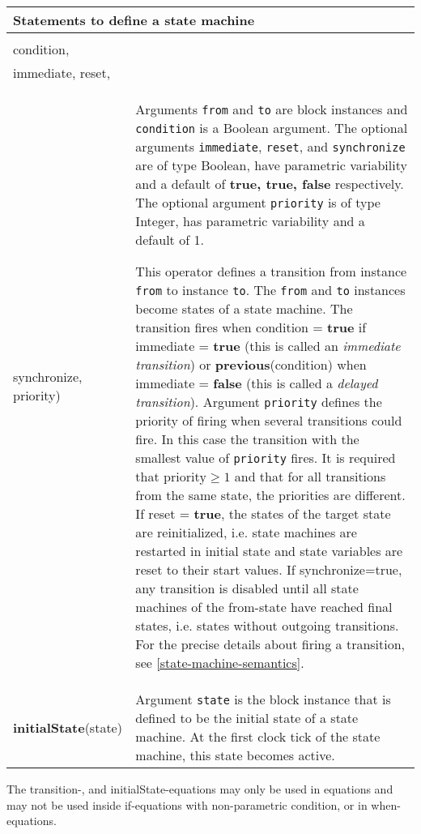 \begin{longtable}[]{|p{4cm}|p{10cm}|}
\hline \endhead
\multicolumn{2}{|p{12cm}|}{\textbf{Statements to define a state machine}}\\ \hline
\begin{tabular}{@{}p{4cm}@{}}
\textbf{transition}(from, to, \\ condition,\\
immediate, reset,\\
synchronize, priority)
\end{tabular}
&
Arguments \lstinline!from! and \lstinline!to! are block instances and \lstinline!condition! is a
Boolean argument. The optional arguments \lstinline!immediate!, \lstinline!reset!, and
\lstinline!synchronize! are of type Boolean, have parametric variability and a
default of \textbf{true, true, false} respectively. The optional
argument \lstinline!priority! is of type Integer, has parametric variability and
a default of 1.

This operator defines a transition from instance \lstinline!from! to instance
\lstinline!to!. The \lstinline!from! and \lstinline!to! instances become states of a state
machine. The transition fires when condition = \textbf{true} if
immediate = \textbf{true} (this is called an \emph{immediate transition})
or \textbf{previous}(condition) when immediate = \textbf{false} (this is
called a \emph{delayed transition}). Argument \lstinline!priority! defines the
priority of firing when several transitions could fire. In this case the
transition with the smallest value of \lstinline!priority! fires. It is required
that $\textrm{priority}\ge 1$ and that for all transitions from the same state, the
priorities are different. If reset = \textbf{true}, the states of the
target state are reinitialized, i.e. state machines are restarted in
initial state and state variables are reset to their start values. If
synchronize=true, any transition is disabled until all state machines of
the from-state have reached final states, i.e. states without outgoing
transitions. For the precise details about firing a transition, see
\autoref{state-machine-semantics}.\\ \hline
\textbf{initialState}(state) & Argument \lstinline!state! is the block instance
that is defined to be the initial state of a state machine. At the first
clock tick of the state machine, this state becomes
active.\\ \hline
\end{longtable}

The transition-, and initialState-equations may only be used in
equations and may not be used inside if-equations with non-parametric
condition, or in when-equations.

